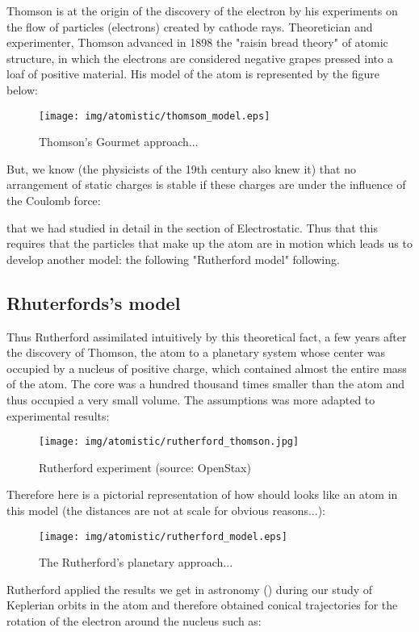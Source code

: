 Thomson is at the origin of the discovery of the electron by his experiments on the flow of particles (electrons) created by cathode rays. Theoretician and experimenter, Thomson advanced in 1898 the "raisin bread theory" of atomic structure, in which the electrons are considered negative grapes pressed into a loaf of positive material. His model of the atom is represented by the figure below:

\begin{figure}[H]
\centering
\texttt{[image: img/atomistic/thomsom\_model.eps]}
\caption{Thomson's Gourmet approach...}
\end{figure}

But, we know (the physicists of the 19th century also knew it) that no arrangement of static charges is stable if these charges are under the influence of the Coulomb force:
	
that we had studied in detail in the section of Electrostatic. Thus that this requires that the particles that make up the atom are in motion which leads us to develop another model: the following "Rutherford model" following.

\subsection{Rhuterfords's model}

Thus Rutherford assimilated intuitively by this theoretical fact, a few years after the discovery of Thomson, the atom to a planetary system whose center was occupied by a nucleus of positive charge, which contained almost the entire mass of the atom. The core was a hundred thousand times smaller than the atom and thus occupied a very small volume. The assumptions was more adapted to experimental results:
	\begin{figure}[H]
		\centering
		\texttt{[image: img/atomistic/rutherford\_thomson.jpg]}	
		\caption{Rutherford experiment (source: OpenStax)}
	\end{figure}
Therefore here is a pictorial representation of how should looks like an atom in this model (the distances are not at scale for obvious reasons...):

\begin{figure}[H]
\centering
\texttt{[image: img/atomistic/rutherford\_model.eps]}
\caption{The Rutherford's planetary approach...}
\end{figure}

Rutherford applied the results we get in astronomy () during our study of Keplerian orbits in the atom and therefore obtained conical trajectories for the rotation of the electron around the nucleus such as:
	
